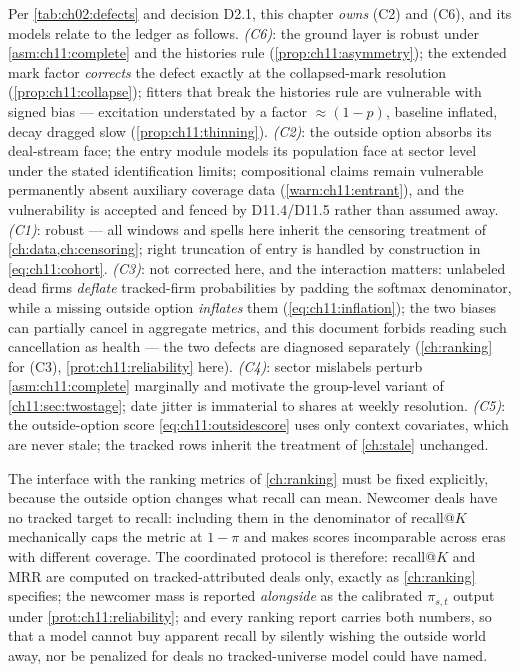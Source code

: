 Per \cref{tab:ch02:defects} and decision D2.1, this chapter \emph{owns}
(C2) and (C6), and its models relate to the ledger as follows.
\emph{(C6)}: the ground layer is robust under
\cref{asm:ch11:complete} and the histories rule
(\cref{prop:ch11:asymmetry}); the extended mark factor \emph{corrects}
the defect exactly at the collapsed-mark resolution
(\cref{prop:ch11:collapse}); fitters that break the histories rule are
vulnerable with signed bias --- excitation understated by a factor
$\approx(1-p)$, baseline inflated, decay dragged slow
(\cref{prop:ch11:thinning}). \emph{(C2)}: the outside option absorbs
its deal-stream face; the entry module models its population face at
sector level under the stated identification limits; compositional
claims remain vulnerable permanently absent auxiliary coverage data
(\cref{warn:ch11:entrant}), and the vulnerability is accepted and
fenced by D11.4/D11.5 rather than assumed away. \emph{(C1)}: robust ---
all windows and spells here inherit the censoring treatment of
\cref{ch:data,ch:censoring}; right truncation of entry is handled by
construction in \cref{eq:ch11:cohort}. \emph{(C3)}: not corrected here,
and the interaction matters: unlabeled dead firms \emph{deflate}
tracked-firm probabilities by padding the softmax denominator, while a
missing outside option \emph{inflates} them
(\cref{eq:ch11:inflation}); the two biases can partially cancel in
aggregate metrics, and this document forbids reading such cancellation
as health --- the two defects are diagnosed separately
(\cref{ch:ranking} for (C3), \cref{prot:ch11:reliability} here).
\emph{(C4)}: sector mislabels perturb \cref{asm:ch11:complete}
marginally and motivate the group-level variant of
\cref{ch11:sec:twostage}; date jitter is immaterial to shares at weekly
resolution. \emph{(C5)}: the outside-option score
\cref{eq:ch11:outsidescore} uses only context covariates, which are
never stale; the tracked rows inherit the treatment of \cref{ch:stale}
unchanged.

The interface with the ranking metrics of \cref{ch:ranking} must be
fixed explicitly, because the outside option changes what recall can
mean. Newcomer deals have no tracked target to recall: including them in
the denominator of recall@$K$ mechanically caps the metric at
$1-\pi$ and makes scores incomparable across eras with different
coverage. The coordinated protocol is therefore: recall@$K$ and MRR are
computed on tracked-attributed deals only, exactly as \cref{ch:ranking}
specifies; the newcomer mass is reported \emph{alongside} as the
calibrated $\pi_{s,t}$ output under \cref{prot:ch11:reliability}; and
every ranking report carries both numbers, so that a model cannot buy
apparent recall by silently wishing the outside world away, nor be
penalized for deals no tracked-universe model could have named.

